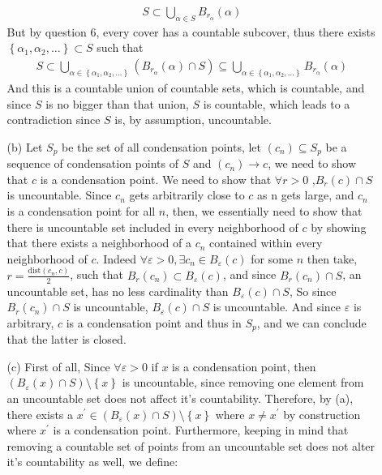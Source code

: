 \documentclass[12pt]{article}
\newcommand\set[1]{\left\lbrace #1 \right\rbrace}
\newcommand\dist[1]{\text{dist}(#1 )}
\begin{document}
\begin{itemize}
\begin{itemize}
        	\begin{align*}
        	S \subset \bigcup_{\alpha \in S} B_{r_\alpha} (\alpha) 
        	\end{align*}
        	But by question 6, every cover has a countable subcover, thus there exists $\set{\alpha_1,\alpha_2,\ldots} \subset S$ such that 
        	\begin{align*}
        		S \subset \bigcup_{\alpha \in \set{\alpha_1,\alpha_2,\ldots}} (B_{r_\alpha} (\alpha) \cap S) \subseteq \bigcup_{\alpha \in \set{\alpha_1,\alpha_2,\ldots}} B_{r_\alpha} (\alpha) 
        	\end{align*}
        	And this is a countable union of countable sets, which is countable, and since $S$ is no bigger than that union, $S$ is countable, which leads to a contradiction since $S$ is, by assumption, uncountable. 
        	\item[(b)]
        	Let $S_p$ be the set of all condensation points, let $(c_n) \subseteq S_p$ be a sequence of condensation points of $S$ and $(c_n) \to c$, we need to show that $c$ is a condensation point. We need to show that $\forall r > 0$ ,$ B_r(c) \cap S$ is uncountable. Since $c_n$ gets arbitrarily close to $c$ as n gets large, and $c_n$ is a condensation point for all $n$, then, we essentially need to show that there is uncountable set included in every neighborhood of $c$ by showing that there exists a neighborhood of a $c_n$ contained within every neighborhood of $c$. Indeed  $\forall \varepsilon > 0, \exists c_n \in B_\varepsilon(c)$ for some $n$ then take, $r = \frac{\dist{c_n,c}}{2}$, such that $B_r(c_n) \subset B_\varepsilon(c)$, and since $B_r(c_n) \cap S$, an uncountable set, has no less cardinality than $B_\varepsilon (c)\cap S$, So since $B_r(c_n) \cap S$ is uncountable, $B_\varepsilon(c)\cap S$ is uncountable. And since $\varepsilon$ is arbitrary, $c$ is a condensation point and thus in $S_p$, and we can conclude that the latter is closed. 
        	\item[(c)]
        	First of all, Since $\forall \varepsilon > 0 $ if $x$ is a condensation point, then $(B_\varepsilon(x) \cap S)\setminus \set{x}$ is uncountable, since removing one element from an uncountable set does not affect it's countability. Therefore, by (a), there exists a $x^\prime \in (B_\varepsilon(x) \cap S)\setminus \set{x}$ where $x \neq x^\prime$ by construction where $x^\prime$ is a condensation point. Furthermore, keeping in mind that removing a countable set of points from an uncountable set does not alter it's countability as well, we define:

\end{itemize}
\end{itemize}
\end{document}
